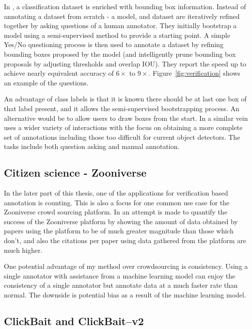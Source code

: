 In \cite{Papadopoulos2016}, a classification dataset is enriched with bounding box information. Instead of annotating a dataset from scratch - a model, and dataset are iteratively refined together by asking questions of a human annotator. They initially bootstrap a model using a semi-supervised method  \cite{Cinbis2017} to provide a starting point. A simple Yes/No questioning process is then used to annotate a dataset by refining bounding boxes proposed by the model (and intelligently prune bounding box proposals by adjusting thresholds and overlap \gls{IOU}). They report the speed up to achieve nearly equivalent accuracy of $6\times$ to $9\times$.  Figure~\ref{fig:verification} shows an example of the questions.

An advantage of class labels is that it is known there should be at last one box of that label present, and it allows the semi-supervised bootstrapping process. An alternative would be to allow users to draw boxes from the start. In a similar vein \cite{Russakovsky2015a} uses a wider variety of interactions with the focus on obtaining a more complete set of annotations including those too difficult for current object detectors. The tasks include both question asking and manual annotation.


\subsection{Citizen science - Zooniverse}

In the later part of this thesis, one of the applications for verification based annotation is counting. This is also a focus for one common use case for the Zooniverse crowd sourcing platform. In \cite{Watson2018} an attempt is made to quantify the success of the Zooniverse platform by showing the amount of data obtained by papers using the platform to be of much greater magnitude than those which don't, and also the citations per paper using data gathered from the platform are much higher. 

One potential advantage of my method over crowdsourcing is consistency. Using a single annotator with assistance from a machine learning model can enjoy the consistency of a single annotator but annotate data at a much faster rate than normal. The downside is potential bias as a result of the machine learning model.

\subsection{ClickBait and ClickBait--v2 \cite{Teng2017, Teng2018}}

